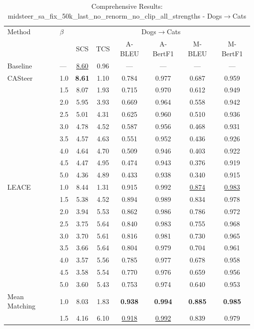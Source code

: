 \begin{table}[htbp]
\centering
\caption{Comprehensive Results: midsteer\_sa\_fix\_50k\_last\_no\_renorm\_no\_clip\_all\_strengths - Dogs$\to$Cats}
\label{tab:single_experiment_table_without_clipping_dogs_to_cats}
\begin{tabular}{l|l|cccccc|}
\hline
Method & $\beta$ & \multicolumn{6}{c|}{Dogs$\rightarrow$Cats} \\
 &  & SCS & TCS & A-BLEU & A-BertF1 & M-BLEU & M-BertF1 \\
\hline
Baseline & — & \underline{8.60} & 0.96 & — & — & — & — \\
\hline
CASteer & 1.0 & \textbf{8.61} & 1.10 & 0.784 & 0.977 & 0.687 & 0.959 \\
 & 1.5 & 8.07 & 1.93 & 0.715 & 0.970 & 0.612 & 0.949 \\
 & 2.0 & 5.95 & 3.93 & 0.669 & 0.964 & 0.558 & 0.942 \\
 & 2.5 & 5.01 & 4.31 & 0.625 & 0.960 & 0.510 & 0.936 \\
 & 3.0 & 4.78 & 4.52 & 0.587 & 0.956 & 0.468 & 0.931 \\
 & 3.5 & 4.57 & 4.63 & 0.551 & 0.952 & 0.436 & 0.926 \\
 & 4.0 & 4.64 & 4.70 & 0.509 & 0.946 & 0.403 & 0.922 \\
 & 4.5 & 4.47 & 4.95 & 0.474 & 0.943 & 0.376 & 0.919 \\
 & 5.0 & 4.36 & 4.89 & 0.433 & 0.938 & 0.340 & 0.915 \\
\hline
LEACE & 1.0 & 8.44 & 1.31 & 0.915 & 0.992 & \underline{0.874} & \underline{0.983} \\
 & 1.5 & 5.38 & 4.52 & 0.894 & 0.989 & 0.834 & 0.978 \\
 & 2.0 & 3.94 & 5.53 & 0.862 & 0.986 & 0.786 & 0.972 \\
 & 2.5 & 3.75 & 5.64 & 0.840 & 0.983 & 0.755 & 0.968 \\
 & 3.0 & 3.70 & 5.61 & 0.816 & 0.981 & 0.730 & 0.965 \\
 & 3.5 & 3.66 & 5.64 & 0.804 & 0.979 & 0.704 & 0.961 \\
 & 4.0 & 3.57 & 5.56 & 0.785 & 0.977 & 0.678 & 0.958 \\
 & 4.5 & 3.58 & 5.54 & 0.770 & 0.976 & 0.659 & 0.956 \\
 & 5.0 & 3.60 & 5.43 & 0.753 & 0.974 & 0.640 & 0.953 \\
\hline
Mean Matching & 1.0 & 8.03 & 1.83 & \textbf{0.938} & \textbf{0.994} & \textbf{0.885} & \textbf{0.985} \\
 & 1.5 & 4.16 & 6.10 & \underline{0.918} & \underline{0.992} & 0.839 & 0.979 \\

\end{tabular}
\end{table}
